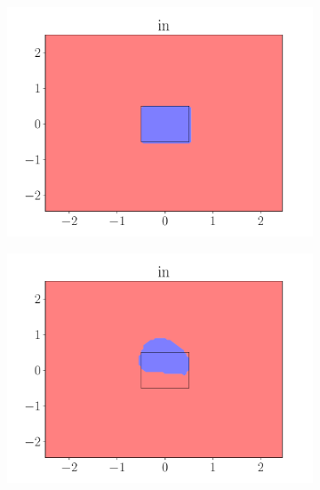 \begin{figure}[ht]
\begin{subfigure}{0.45\textwidth}
            \includegraphics[width=\textwidth]{figures/in_rule.pdf}
        \end{subfigure}
        \begin{subfigure}{0.45\textwidth}
            \centering
            \includegraphics[width=\textwidth]{figures/in_predicate_only.pdf}
        \end{subfigure}
        \begin{subfigure}{0.45\textwidth}
            \centering

\end{subfigure}
\end{figure}
